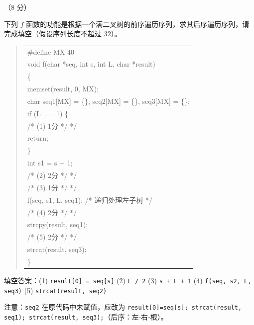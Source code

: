 \begin{question}[根据前序求后序]（8 分）

下列 $f$ 函数的功能是根据一个满二叉树的前序遍历序列，求其后序遍历序列，请完成填空（假设序列长度不超过 $32$）。

\begin{quote}
\footnotesize
\begin{tabular}{@{}l@{}}
\#define MX 40\\
void f(char *seq, int s, int L, char *result)\\
\{\\
    memset(result, 0, MX);\\
    char seq1[MX] = \{\}, seq2[MX] = \{\}, seq3[MX] = \{\};\\
    if (L == 1) \{\\
\underline{\hspace{12em}} /* (1) 1分 */ */\\
        return;\\
    \}\\
    int s1 = s + 1;\\
\underline{\hspace{12em}} /* (2) 2分 */ */\\
\underline{\hspace{12em}} /* (3) 1分 */ */\\
    f(seq, s1, L, seq1);                   /* 递归处理左子树 */\\
\underline{\hspace{12em}} /* (4) 2分 */ */\\
    strcpy(result, seq1);\\
\underline{\hspace{12em}} /* (5) 2分 */ */\\
    strcat(result, seq3);\\
\}\\
\end{tabular}
\end{quote}

\begin{solution}
填空答案：(1) \texttt{result[0] = seq[s]} (2) \texttt{L / 2} (3) \texttt{s + L + 1} (4) \texttt{f(seq, s2, L, seq3)} (5) \texttt{strcat(result, seq2)}

注意：\texttt{seq2} 在原代码中未赋值，应改为 \texttt{result[0]=seq[s]; strcat(result, seq1); strcat(result, seq3);}（后序：左-右-根）。
\end{solution}
\end{question}

